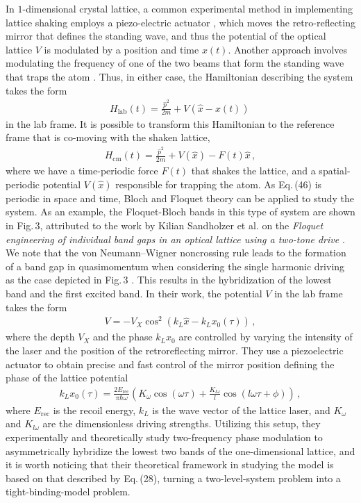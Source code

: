 \documentclass[reprint, amsmath, amssymb, aps]{revtex4-2}
\begin{document}
In $1$-dimensional crystal lattice, a common experimental method in implementing lattice shaking employs a piezo-electric actuator \cite{Viebahn, Sandholzer}, which moves the retro-reflecting mirror that defines the standing wave, and thus the potential of the optical lattice $V$ is modulated by a position and time $x(t)$. Another approach involves modulating the frequency of one of the two beams that form the standing wave that traps the atom \cite{Viebahn}. Thus, in either case, the Hamiltonian describing the system takes the form
\begin{align}
H_{\text{lab}}(t) = \frac{\hat{p}^2}{2m} + V(\hat{x} - x(t))\,
\end{align}
in the lab frame. It is possible to transform this Hamiltonian to the reference frame that is co-moving with the shaken lattice,
\begin{align}
H_{\text{cm}}(t) = \frac{\hat{p}^2}{2m} + V(\hat{x}) - F(t)\hat{x}\,,
\end{align}
where we have a time-periodic force $F(t)$ that shakes the lattice, and a spatial-periodic potential $V(\hat{x})$ responsible for trapping the atom. As Eq.\,(46) is periodic in space and time, Bloch and Floquet theory can be applied to study the system. As an example, the Floquet-Bloch bands in this type of system are shown in Fig.\,3, attributed to the work by Kilian Sandholzer et al. on the \textit{Floquet engineering of individual band gaps in an optical lattice using a two-tone drive} \cite{Sandholzer}. We note that the von Neumann–Wigner noncrossing rule leads to the formation of a band gap in quasimomentum when considering the single harmonic driving as the case depicted in Fig.\,3 \cite{57}. This results in the hybridization of the lowest band and the first excited band. In their work, the potential $V$ in the lab frame takes the form
\begin{align}
V = -V_X \cos^2\left( k_L \hat{x} - k_L x_0(\tau)\right)\,,
\end{align}
where the depth $V_X$ and the phase $k_Lx_0$ are controlled by varying the intensity of the laser and the position of the retroreflecting mirror. They use a piezoelectric actuator to obtain precise and fast control of the mirror position defining the phase of the lattice potential 
\begin{align}
k_Lx_0(\tau) = \frac{2E_{\text{rec}}}{\pi \hbar \omega}\left( K_\omega \cos(\omega \tau) + \frac{K_{l\omega}}{l}\cos(l\omega \tau +\phi)\right)\,,
\end{align}
where $E_{\text{rec}}$ is the recoil energy, $k_L$ is the wave vector of the lattice laser, and $K_\omega$ and $K_{l\omega}$ are the dimensionless driving strengths. Utilizing this setup, they experimentally and theoretically study two-frequency phase modulation to asymmetrically hybridize the lowest two bands of the one-dimensional lattice, and it is worth noticing that their theoretical framework in studying the model is based on that described by Eq.\,(28), turning a two-level-system problem into a tight-binding-model problem. 
\end{document}

